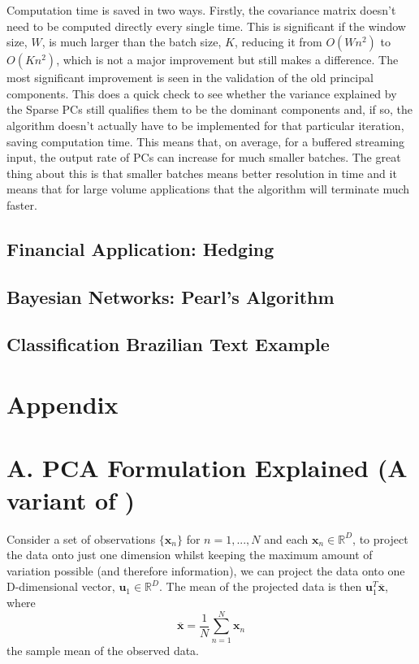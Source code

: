 \documentclass[11pt,a4paper]{article}
\begin{document}
Computation time is saved in two ways. Firstly, the covariance matrix doesn't need to be computed directly every single time. This is significant if the window size, $W$, is much larger than the batch size, $K$, reducing it from $O(Wn^2)$ to $O(Kn^2)$, which is not a major improvement but still makes a difference. The most significant improvement is seen in the validation of the old principal components. This does a quick check to see whether the variance explained by the Sparse PCs still qualifies them to be the dominant components and, if so, the algorithm doesn't actually have to be implemented for that particular iteration, saving computation time. This means that, on average, for a buffered streaming input, the output rate of PCs can increase for much smaller batches. The great thing about this is that smaller batches means better resolution in time and it means that for large volume applications that the algorithm will terminate much faster. 

\subsection{Financial Application: Hedging}

\subsection{Bayesian Networks: Pearl's Algorithm}
\subsection{Classification Brazilian Text Example}
\clearpage



\clearpage

\section*{Appendix}\label{appendixa}

\appendix
{}

\section*{A. PCA Formulation Explained (A variant of \cite{bishop})}

Consider a set of observations $\{\mathbf{x}_n\}$ for $n = 1, ..., N$ and each $\mathbf{x}_n \in \mathbb{R}^D$, to project the data onto just one dimension whilst keeping the maximum amount of variation possible (and therefore information), we can project the data onto one D-dimensional vector, $\mathbf{u}_1 \in \mathbb{R}^D$. The mean of the projected data is then $\mathbf{u}_1^T \mathbf{\overline{x}}$, where
\begin{equation*}
\mathbf{\overline{x}} = \frac{1}{N} \sum_{n = 1}^N \mathbf{x}_n 
\end{equation*} 
the sample mean of the observed data.
\end{document}
